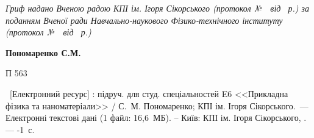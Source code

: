 {\begin{alwayssingle}
		\vfill

		\begin{center}\itshape\small
			Гриф надано Вченою радою КПІ ім. Ігоря Сікорського (протокол №~\KPINo~від \KPIDate~р.) за поданням Вченої ради Навчально-наукового Фізико-технічного інституту (протокол №~\IPTNo~від \IPTDate~р.)
		\end{center}
		\vfill

		\noindent
		\phantom{П 563}\hfill%
		\begin{minipage}[t]{0.85\textwidth}\small
			\textbf{Пономаренко С.М.}
		\end{minipage}

		\noindent%
		П 563\hfill \begin{minipage}[t]{0.85\textwidth}\small
			\hspace{2em}\realtitle\ [Електронний ресурс] : підруч. для студ. спеціальностей
			E6 <<Прикладна фізика та наноматеріали>> / С.~М. Пономаренко; КПІ ім. Ігоря Сікорського.~--- Електронні
			текстові дані
			(1 файл: 16{,}6~МБ). – Київ: КПІ ім. Ігоря Сікорського, \the\year. ---
			\the\numexpr{}-1\relax~с.
		\end{minipage}

		\vfill



\end{alwayssingle}}
